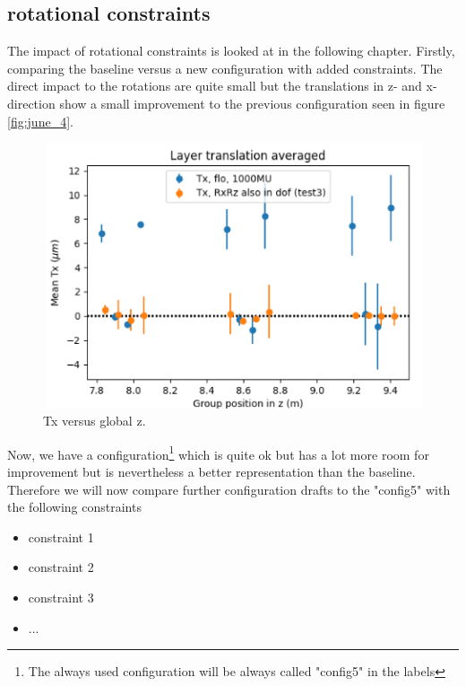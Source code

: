 \subsection{rotational constraints}
The impact of rotational constraints is looked at in the following chapter.
Firstly, comparing the baseline versus a new configuration with added constraints.
The direct impact to the rotations are quite small but the translations
in z- and x-direction show a small improvement to the previous configuration
seen in figure \ref{fig:june_4}.

\begin{figure}
  \centering
  \includegraphics[width=\textwidth]{plots/july_28/Tx.png}
  \caption{Tx versus global z.}
  \label{fig:TxZ}
\end{figure}

Now, we have a configuration\footnote{The always used configuration will be
always called "config5" in the labels} which is quite ok but has a lot more room for improvement but is nevertheless a better representation than the baseline.
Therefore we will now compare further configuration drafts to the "config5" with the following constraints
\begin{itemize}
  \item constraint 1
  \item constraint 2
  \item constraint 3
  \item ...
\end{itemize}

